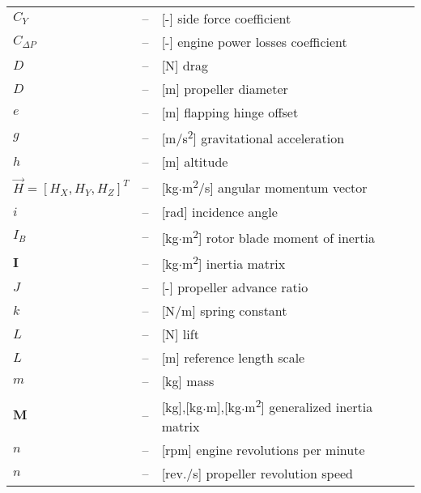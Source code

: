 \begin{longtable}[l]{ l l p{} }
  $C_Y$                                                  & -- & [-] side force coefficient \\
  $C_{\Delta P}$                                         & -- & [-] engine power losses coefficient \\
  $D$                                                    & -- & [N] drag \\
  $D$                                                    & -- & [m] propeller diameter \\
  $e$                                                    & -- & [m] flapping hinge offset \\
  $g$                                                    & -- & [m/s\textsuperscript{2}] gravitational acceleration \\
  $h$                                                    & -- & [m] altitude \\
  $\vec H=\left[ H_X, H_Y, H_Z \right]^T$                & -- & [kg$\cdot$m\textsuperscript{2}/s] angular momentum vector \\
  $i$                                                    & -- & [rad] incidence angle \\
  $I_B$                                                  & -- & [kg$\cdot$m\textsuperscript{2}] rotor blade moment of inertia \\
  $\boldsymbol I$                                        & -- & [kg$\cdot$m\textsuperscript{2}] inertia matrix \\
  $J$                                                    & -- & [-] propeller advance ratio \\
  $k$                                                    & -- & [N/m] spring constant \\
  $L$                                                    & -- & [N] lift \\
  $L$                                                    & -- & [m] reference length scale \\
  $m$                                                    & -- & [kg] mass \\
  $\boldsymbol M$                                        & -- & [kg],[kg$\cdot$m],[kg$\cdot$m\textsuperscript{2}] generalized inertia matrix \\
  $n$                                                    & -- & [rpm] engine revolutions per minute \\
  $n$                                                    & -- & [rev./s] propeller revolution speed \\

\end{longtable}
